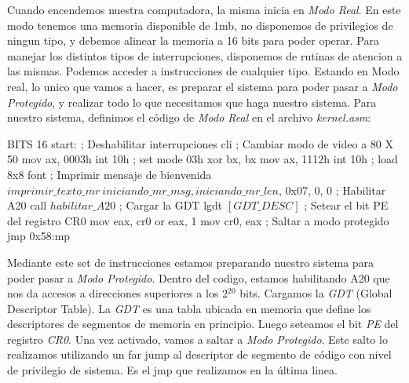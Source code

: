 Cuando encendemos nuestra computadora, la misma inicia en \textit{Modo Real}. En este modo tenemos una memoria disponible de 1mb, no disponemos de privilegios de ningun tipo, y debemos alinear la memoria a 16 bits para poder operar.
Para manejar los distintos tipos de interrupciones, disponemos de rutinas de atencion a las mismas. Podemos acceder a instrucciones de cualquier tipo.
Estando en Modo real, lo unico que vamos a hacer, es preparar el sistema para poder pasar a \textit{Modo Protegido}, y realizar todo lo que necesitamos que haga nuestro sistema.
Para nuestro sistema, definimos el c\'odigo de \textit{Modo Real} en el archivo \textit{kernel.asm}:

\begin{algorithmic}
\State \tab BITS 16
\State \tab start:
    \State \tab \tab ; Deshabilitar interrupciones
    \State \tab \tab cli
\newline
\State \tab \tab     ; Cambiar modo de video a 80 X 50
    \State \tab \tab mov ax, 0003h
    \State \tab \tab int 10h ; set mode 03h
    \State \tab \tab xor bx, bx
    \State \tab \tab mov ax, 1112h
    \State \tab \tab int 10h ; load 8x8 font
\newline
    \State \tab \tab ; Imprimir mensaje de bienvenida
    \State \tab \tab $imprimir\_texto\_mr \ iniciando\_mr\_msg, iniciando\_mr\_len$, 0x07, 0, 0
    \State \tab \tab ; Habilitar A20
    \State \tab \tab call $habilitar\_A20$
    \State \tab \tab ; Cargar la GDT
    \State \tab \tab lgdt $[GDT\_DESC]$
    \newline
    \State \tab \tab ; Setear el bit PE del registro CR0
    \State \tab \tab mov eax, cr0
    \State \tab \tab or eax, 1
    \State \tab \tab mov cr0, eax
    \newline
    \State \tab \tab ; Saltar a modo protegido
    \State \tab \tab jmp 0x58:mp

    \end{algorithmic}

Mediante este set de instrucciones estamos preparando nuestro sistema para poder pasar a \textit{Modo Protegido}.
Dentro del codigo, estamos habilitando A20 que nos da accesos a direcciones superiores a los 2$^{20}$ bits.\newline
Cargamos la \textit{GDT} (Global Descriptor Table).
La \textit{GDT} es una tabla ubicada en memoria que define los descriptores de segmentos de memoria en principio.
Luego seteamos el bit \textit{PE} del registro \textit{CR0}.
\newline
Una vez activado, vamos a saltar a \textit{Modo Protegido}. Este salto lo realizamos utilizando un far jump al descriptor de segmento de c\'odigo con nivel de privilegio de sistema. Es el jmp que realizamos en la \'ultima linea.
